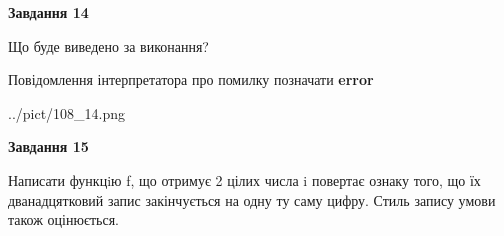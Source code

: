 \documentclass[11pt, ukrainian]{article}
\begin{document}
{\begin {large}
{\begin {center}\textbf{Завдання 14}\end {center}}\par
Що буде виведено за виконання? \par
Повідомлення інтерпретатора про помилку позначати \textbf{error}

\begin{center}
	{../pict/108_14.png}
\end{center}
\newpage

{\begin {center}\textbf{Завдання 15}\end {center}}\par

Написати функцiю f, що отримує 2 цілих числа i повертає ознаку того, що їх дванадцятковий запис закінчується на одну ту саму цифру. Стиль запису умови також оцінюється.\par
\newpage

\end {large}}
\end{document}
